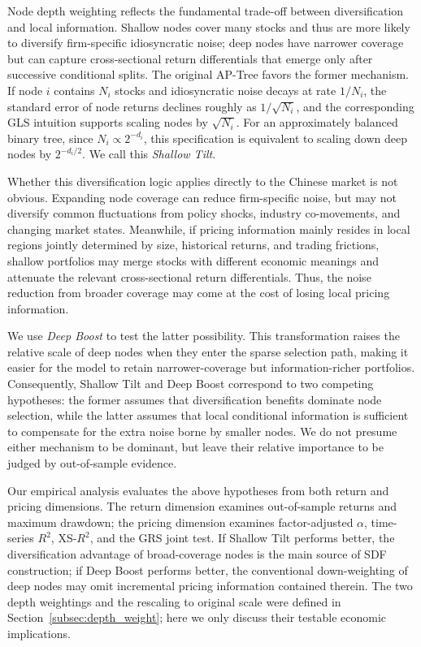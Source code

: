 \documentclass[12pt]{article}
\begin{document}
Node depth weighting reflects the fundamental trade-off between diversification and local information. Shallow nodes cover many stocks and thus are more likely to diversify firm-specific idiosyncratic noise; deep nodes have narrower coverage but can capture cross-sectional return differentials that emerge only after successive conditional splits. The original AP-Tree favors the former mechanism. If node \(i\) contains \(N_i\) stocks and idiosyncratic noise decays at rate \(1/N_i\), the standard error of node returns declines roughly as \(1/\sqrt{N_i}\), and the corresponding GLS intuition supports scaling nodes by \(\sqrt{N_i}\). For an approximately balanced binary tree, since \(N_i\propto 2^{-d_i}\), this specification is equivalent to scaling down deep nodes by \(2^{-d_i/2}\). We call this \emph{Shallow Tilt}.

Whether this diversification logic applies directly to the Chinese market is not obvious. Expanding node coverage can reduce firm-specific noise, but may not diversify common fluctuations from policy shocks, industry co-movements, and changing market states. Meanwhile, if pricing information mainly resides in local regions jointly determined by size, historical returns, and trading frictions, shallow portfolios may merge stocks with different economic meanings and attenuate the relevant cross-sectional return differentials. Thus, the noise reduction from broader coverage may come at the cost of losing local pricing information.

We use \emph{Deep Boost} to test the latter possibility. This transformation raises the relative scale of deep nodes when they enter the sparse selection path, making it easier for the model to retain narrower-coverage but information-richer portfolios. Consequently, Shallow Tilt and Deep Boost correspond to two competing hypotheses: the former assumes that diversification benefits dominate node selection, while the latter assumes that local conditional information is sufficient to compensate for the extra noise borne by smaller nodes. We do not presume either mechanism to be dominant, but leave their relative importance to be judged by out-of-sample evidence.

Our empirical analysis evaluates the above hypotheses from both return and pricing dimensions. The return dimension examines out-of-sample returns and maximum drawdown; the pricing dimension examines factor-adjusted \(\alpha\), time-series \(R^2\), XS-\(R^2\), and the GRS joint test. If Shallow Tilt performs better, the diversification advantage of broad-coverage nodes is the main source of SDF construction; if Deep Boost performs better, the conventional down-weighting of deep nodes may omit incremental pricing information contained therein. The two depth weightings and the rescaling to original scale were defined in Section~\ref{subsec:depth_weight}; here we only discuss their testable economic implications.
\end{document}
